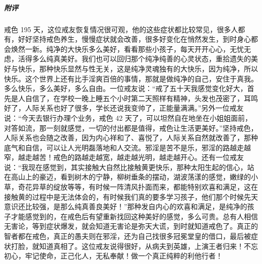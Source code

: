 \begin{case}
    \subparagraph{附评} 戒色 195 天，这位戒友恢复情况很可观，他的这些症状都比较常见，很多人都有，好好坚持戒色养生，慢慢症状就会改善，很多好变化在悄然发生，到时身心都会焕然一新。纯净的大快乐多么美好，看看那些小孩子，每天开开心心，无忧无虑，活得多么纯真美好。我们也可以回归那个纯净纯善的心灵状态，重拾遗失的美好与快乐，那种快乐显然与性无关，这是纯净灵魂独有的大快乐，因为纯净，所以快乐。这个世界上还有比手淫爽百倍的事情，那就是做纯净的自己，安住于真我。多么快乐，多么美好，多么自由。一位戒友说：“戒了五十天我感觉变化好大，首先是人自信了，在学校一晚上睡五个小时第二天照样有精神，头发也茂密了，耳鸣好了，人际关系也好了很多，学长还说我变帅了，正能量满满。”另外一位戒友说：“今天去银行办理个业务，戒色 42 天了，可以坦然自在地坐在小姐姐面前，对答如流，那一刻就感觉，一切的付出都是值得，戒色让生活更美好。”坚持戒色，人际关系也会随之改善，因为内心祥和了、喜悦了，人际关系自然就改善了，那种底气和自信，可以让人光明磊落地和人交流。邪淫是苦不是乐，邪淫的路越走越窄，越走越苦！戒色的路越走越宽，越走越光明，越走越开心。还有一位戒友说：“我现在感觉到，其实接触大自然比接触黄更快乐，那种太阳生起的信心，站在高山上的豪迈，看到树木的宁静，柳树垂条的摆动，湖波荡漾的感觉，嫩绿的小草，奇花异草的绽放等等，有时候一阵清风扑面而来，都能特别欢喜和满足，这在接触黄的过程中是无法体会的，有时候我们真的要多学习孩子，他们那个时候先天意识还比较强，是那么纯真善良美好！”那种发自内心的欢喜和满足，是纯净的孩子才能感觉到的，在戒色后有望重新找回这种美好的感觉，多么可贵。总有人相信无害论，等到症状爆发，就会知道无害论是弥天大谎，到时就知道戒色了。真正的智者都在戒色，真正的愚夫则在邪淫，还为自己找很多冠冕堂皇的借口，最后被症状打脸，就知道真相了。这位戒友说得很好，从病夫到英雄，上演王者归来！不忘初心，牢记使命，正己化人，无私奉献！做一个真正纯粹的利他行者！
\end{case}

